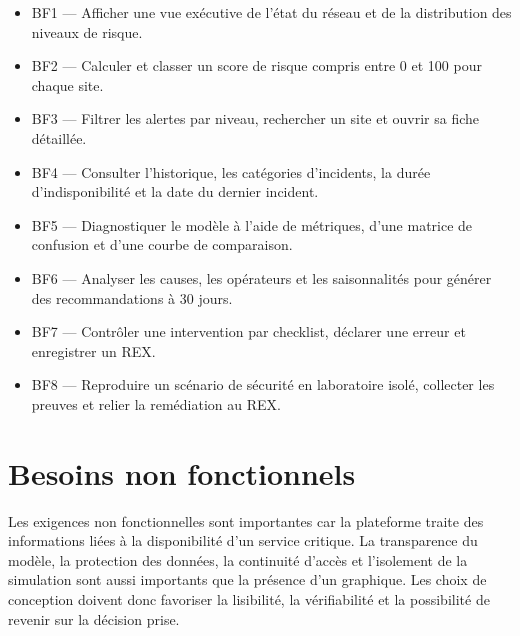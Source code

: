 \documentclass[12pt,a4paper,oneside]{report}
\begin{document}
\begin{itemize}
  \item BF1 — Afficher une vue exécutive de l’état du réseau et de la distribution des niveaux de risque.
  \item BF2 — Calculer et classer un score de risque compris entre 0 et 100 pour chaque site.
  \item BF3 — Filtrer les alertes par niveau, rechercher un site et ouvrir sa fiche détaillée.
  \item BF4 — Consulter l’historique, les catégories d’incidents, la durée d’indisponibilité et la date du dernier incident.
  \item BF5 — Diagnostiquer le modèle à l’aide de métriques, d’une matrice de confusion et d’une courbe de comparaison.
  \item BF6 — Analyser les causes, les opérateurs et les saisonnalités pour générer des recommandations à 30 jours.
  \item BF7 — Contrôler une intervention par checklist, déclarer une erreur et enregistrer un REX.
  \item BF8 — Reproduire un scénario de sécurité en laboratoire isolé, collecter les preuves et relier la remédiation au REX.
\end{itemize}

\section{Besoins non fonctionnels}

Les exigences non fonctionnelles sont importantes car la plateforme traite des informations liées à la disponibilité d’un service critique. La transparence du modèle, la protection des données, la continuité d’accès et l’isolement de la simulation sont aussi importants que la présence d’un graphique. Les choix de conception doivent donc favoriser la lisibilité, la vérifiabilité et la possibilité de revenir sur la décision prise.
\end{document}
